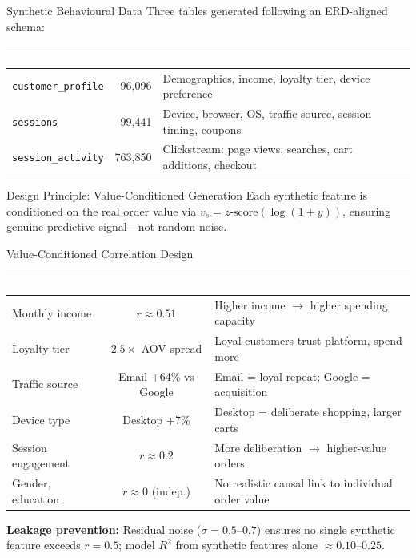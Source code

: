 \documentclass[aspectratio=169,10pt]{beamer}
\begin{document}
\begin{frame}{Synthetic Behavioural Data}
  Three tables generated following an ERD-aligned schema:

  \vspace{6pt}
  \small
  \begin{tabularx}{\textwidth}{l r X}
    \toprule
    \rowcolor{brandcolor}
    \textcolor{white}{\textbf{Table}} & \textcolor{white}{\textbf{Rows}} & \textcolor{white}{\textbf{Contents}} \\
    \midrule
    \texttt{customer\_profile} & 96{,}096 & Demographics, income, loyalty tier, device preference \\
    \texttt{sessions}          & 99{,}441 & Device, browser, OS, traffic source, session timing, coupons \\
    \texttt{session\_activity} & 763{,}850 & Clickstream: page views, searches, cart additions, checkout \\
    \bottomrule
  \end{tabularx}

  \vspace{10pt}
  \begin{alertblock}{Design Principle: Value-Conditioned Generation}
    Each synthetic feature is conditioned on the real order value via
    $v_s = z\text{-score}(\log(1+y))$, ensuring genuine predictive
    signal---not random noise.
  \end{alertblock}
\end{frame}

\begin{frame}{Value-Conditioned Correlation Design}
  \small
  \begin{tabularx}{\textwidth}{l c X}
    \toprule
    \rowcolor{brandcolor}
    \textcolor{white}{\textbf{Feature}} & \textcolor{white}{\textbf{Target Effect}} & \textcolor{white}{\textbf{Rationale}} \\
    \midrule
    Monthly income      & $r \approx 0.51$     & Higher income $\rightarrow$ higher spending capacity \\
    Loyalty tier        & $2.5\times$ AOV spread & Loyal customers trust platform, spend more \\
    Traffic source      & Email +64\% vs Google  & Email = loyal repeat; Google = acquisition \\
    Device type         & Desktop +7\%           & Desktop = deliberate shopping, larger carts \\
    Session engagement  & $r \approx 0.2$        & More deliberation $\rightarrow$ higher-value orders \\
    \midrule
    \rowcolor{lightgray}
    Gender, education   & $r \approx 0$ (indep.) & No realistic causal link to individual order value \\
    \bottomrule
  \end{tabularx}

  \vspace{8pt}
  \textbf{Leakage prevention:} Residual noise ($\sigma = 0.5$--$0.7$) ensures
  no single synthetic feature exceeds $r = 0.5$; model $R^{2}$ from synthetic
  features alone $\approx 0.10$--$0.25$.
\end{frame}
\end{document}
